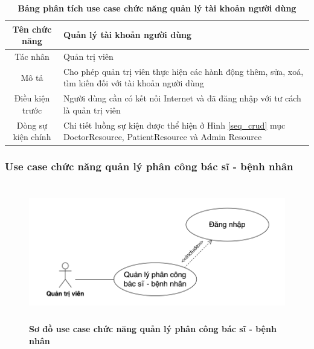   \begin{table}[H]
    \caption{\bfseries \fontsize{12pt}{0pt}\selectfont Bảng phân tích use case chức năng quản lý tài khoản người dùng}
    \centering
    \begin{tabularx}{0.9\textwidth}{|c|X|}
      \hline
      \textbf{Tên chức năng} & \textbf{Quản lý tài khoản người dùng} \\
      \hline
      Tác nhân & Quản trị viên \\
      \hline
      Mô tả & Cho phép quản trị viên thực hiện các hành động thêm, sửa, xoá, tìm kiến đối với tài khoản người dùng \\
      \hline
      Điều kiện trước & Người dùng cần có kết nối Internet và đã đăng nhập với tư cách là quản trị viên \\
      \hline
      Dòng sự kiện chính & 
        Chi tiết luồng sự kiện được thể hiện ở Hình \ref{seq_crud} mục DoctorResource, PatientResource và Admin Resource\\
      \hline
    \end{tabularx}
  \end{table}

\subsubsection{Use case chức năng quản lý phân công bác sĩ - bệnh nhân}
  \begin{figure}[H]
    \centering
    \includegraphics[width=15cm,height=6cm]{Images/use_case/use_case_assign_doctor.png}
    \caption[Sơ đồ use case chức năng quản lý phân công bác sĩ - bệnh nhân]{\bfseries \fontsize{12pt}{0pt}
    \selectfont Sơ đồ use case chức năng quản lý phân công bác sĩ - bệnh nhân}
    \label{use_case_assign_doctor} %
  \end{figure}

